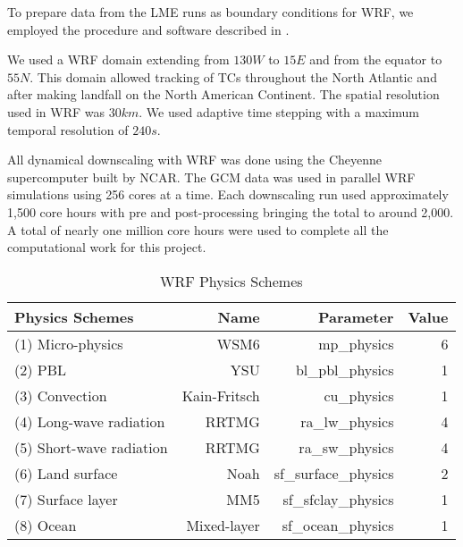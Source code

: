 To prepare data from the LME runs as boundary conditions for WRF, we
employed the procedure and software described in \cite{tech_notes}.

We used a WRF domain extending from $130W$ to $15E$ and from the equator to $55N$. This domain allowed tracking of TCs throughout the North Atlantic and after making landfall on the North American Continent. The spatial resolution used in WRF was $30km$. We used adaptive time stepping with a maximum temporal resolution of $240s$.
\par
All dynamical downscaling with WRF was done using the Cheyenne supercomputer built by NCAR. The GCM data was used in parallel WRF simulations using 256 cores at a time. Each downscaling run used approximately 1,500 core hours with pre and post-processing bringing the total to around 2,000. A total of nearly one million core hours were used to complete all the computational work for this project.  

\begin{table}[!tbp]
\centering
\begin{tabular}{lrrr}
\toprule
             Physics Schemes &  Name & Parameter & Value \\ 
\midrule
            (1) Micro-physics &     WSM6 &  mp\_physics & 6 \\  
            (2) PBL &    YSU &  bl\_pbl\_physics &  1 \\    
            (3) Convection &   Kain-Fritsch &  cu\_physics & 1 \\    
            (4) Long-wave radiation &    RRTMG &   ra\_lw\_physics & 4 \\    
            (5) Short-wave radiation &    RRTMG &   ra\_sw\_physics & 4 \\    
            (6) Land surface &   Noah &   sf\_surface\_physics & 2 \\    
            (7) Surface layer &    MM5 &  sf\_sfclay\_physics &  1 \\    
            (8) Ocean &    Mixed-layer &  sf\_ocean\_physics &  1 \\    
\bottomrule
\end{tabular}
\caption{WRF Physics Schemes}
\label{wrf_specs}
\end{table}

